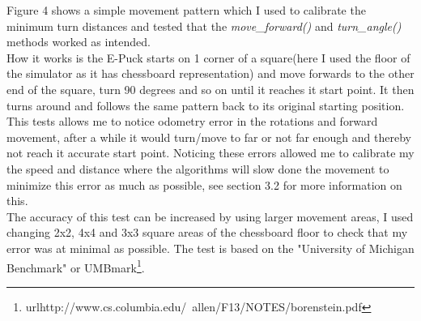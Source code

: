 Figure 4 shows a simple movement pattern which I used to calibrate the minimum turn distances and tested that the \textit{move\_forward()} and \textit{turn\_angle()} methods worked as intended. \\
How it works is the E-Puck starts on 1 corner of a square(here I used the floor of the simulator as it has chessboard representation) and move forwards to the other end of the square, turn 90 degrees and so on until it reaches it start point. It then turns around and follows the same pattern back to its original starting position. This tests allows me to notice odometry error in the rotations and forward movement, after a while it would turn/move to far or not far enough and thereby not reach it accurate start point. Noticing these errors allowed me to calibrate my the speed and distance where the algorithms will slow done the movement to minimize this error as much as possible, see section 3.2 for more information on this.\\[3ex]

The accuracy of this test can be increased by using larger movement areas, I used changing 2x2, 4x4 and 3x3 square areas of the chessboard floor to check that my error was at minimal as possible. The test is based on the "University of Michigan Benchmark" or UMBmark\footnote{url{http://www.cs.columbia.edu/~allen/F13/NOTES/borenstein.pdf}}.

